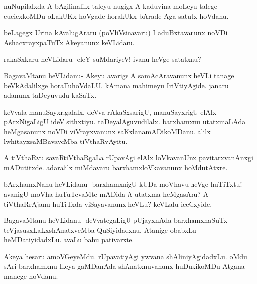 \documentclass{article}
\begin{document}
\begin{mng}%
nuNupilalxda A bAgilinalilx taleyu nugigx A kaduvina moLeyu
talege cucicxkoMDu oLakUKx hoVgade horakUkx bArade Aga satutx hoVdanu.
\end{mng}

\begin{mng}%
beLagegx Urina kAvalugAraru (poVliVsinavaru) I aduBxtavanunx
noVDi AshacxrayxpaTuTx Akeyanunx keVLidaru.
\end{mng}

\begin{mng}%
rakaSxkaru heVLidaru- eleY suMdariyeV! ivanu heVge satatxnu?
\end{mng}

\begin{mng}%
BagavaMtanu heVLidanu- Akeyu avarige A samAcAravanunx
heVLi tanage beVkAdalilxge horaTuhoVdaLU. kAmana mahimeyu IriVtiyAgide.
janaru adanunx taDeyuvudu kaSaTx.
\end{mng}

\begin{mng}%
keVvala manuSayxrigalalx. deVva rAkaSxsarigU, manuSayxrigU elAlx
pArxNigaLigU ideV sithxtiyu. taDeyalAguvudilalx. barxhamxnu utatxmaLAda
heMgasanunx noVDi viVrayxvanunx saKxlanamADikoMDanu. alilx lwhitayxsaMBavaveMba
tiVthaRvAyitu.
\end{mng}

\begin{mng}%
A tiVthaRvu savaRtiVthaRgaLa rUpavAgi elAlx loVkavanUnx
pavitarxvanAnxgi mADutitxde. adaralilx miMdavaru barxhamxloVkavanunx
hoMdutAtxre.
\end{mng}

\begin{mng}%
bArxhamxNanu heVLidanu- barxhamxnigU kUDa moVhavu heVge
huTiTxtu! avanigU moVha huTuTcvaMte mADida A utatxma heMgasAru?
A tiVthaRrAjanu huTiTxda viSayavanunx heVLu? keVLalu iceCxyide.
\end{mng}

\begin{mng}%
BagavaMtanu heVLidanu- deVvategaLigU pUjayxnAda barxhamxnaSuTx
teVjasusxLaLxshAnatxveMba QuSiyidadxnu. Atanige obabxLu heMDatiyidadxLu.
avaLu bahu pativarxte.
\end{mng}

\begin{mng}%
Akeya hesaru amoVGeyeMdu. rUpavatiyAgi ywvana
shAliniyAgidadxLu. oMdu sAri barxhamxnu Ikeya gaMDanAda shAnatxnuvanunx
huDukikoMDu Atgana manege hoVdanu.
\end{mng}
\end{document}
